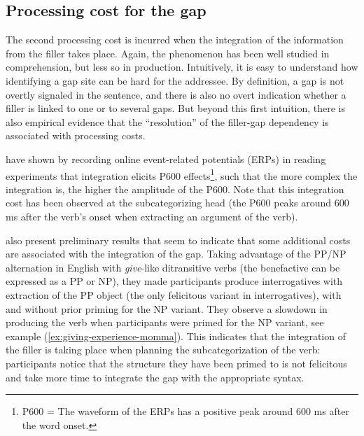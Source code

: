 \subsection{Processing cost for the gap}

The second processing cost is incurred when the integration of the information from the filler takes place. Again, the phenomenon has been well studied in comprehension, but less so in production. Intuitively, it is easy to understand how identifying a gap site can be hard for the addressee. By definition, a gap is not overtly signaled in the sentence, and there is also no overt indication whether a filler is linked to one or to several gaps. But beyond this first intuition, there is also empirical evidence that the ``resolution'' of the filler-gap dependency is associated with processing costs. 

\citet{Kaan.2000} have shown by recording online event-related potentials (ERPs) in reading experiments that integration elicits P600 effects\footnote{P600 = The waveform of the ERPs has a positive peak around 600 ms after the word onset.}, such that the more complex the integration is, the higher the amplitude of the P600. Note that this integration cost has been observed at the subcategorizing head (the P600 peaks around 600 ms after the verb's onset when extracting an argument of the verb). 

\citet{Momma.2019} also present preliminary results that seem to indicate that some additional costs are associated with the integration of the gap. Taking advantage of the PP/NP alternation in English with \emph{give}-like ditransitive verbs (the benefactive can be expressed as a PP or NP), they made participants produce interrogatives with extraction of the PP object (the only felicitous variant in interrogatives), with and without prior priming for the NP variant. They observe a slowdown in producing the verb when participants were primed for the NP variant, see example (\ref{ex:giving-experience-momma}). This indicates that the integration of the filler is taking place when planning the subcategorization of the verb: participants notice that the structure they have been primed to is not felicitous and take more time to integrate the gap with the appropriate syntax.

\label{ex:giving-experience-momma}
\z 

